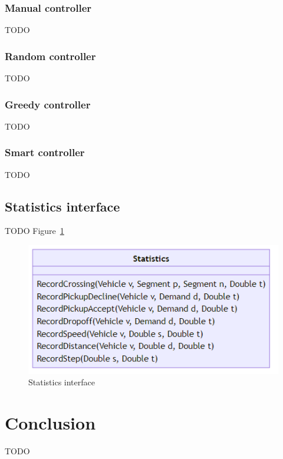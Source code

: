 \documentclass{IEEEtran}
\begin{document}
    \subsubsection{Manual controller}
    TODO

    \subsubsection{Random controller}
    TODO
    
    \subsubsection{Greedy controller}
    TODO

    \subsubsection{Smart controller}
    TODO

    \subsection{Statistics interface}
    \label{sec:statistics}
    TODO Figure~\ref{fig:statistics}

    \begin{figure}[htbp]
        \centering
        \includegraphics[scale=0.5]{../../diagrams/statistics/classes.png}
        \caption{Statistics interface}
        \label{fig:statistics}
    \end{figure}

    \section{Conclusion}
    \label{sec:con}
    TODO

    
    
\end{document}

